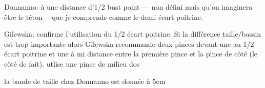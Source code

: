 \documentclass[10pt,a4paper,twoside]{report}
\begin{document}
Donnanno: à une distance d'1/2 bust point --- non défini mais qu'on imaginera être le téton--- que je comprends comme le demi écart poitrine.

Gilewska: confirme l'utilisation du 1/2 écart poitrine. Si la différence taille/bassin est trop importante alors Gilewska recommande deux pinces devant une au 1/2 écart poitrine et une à mi distance entre la première pince et la pince de côté (le côté de fait). utlise une pince de milieu dos

la bande de taille chez Donnanno est donnée à 5cm



\end{document}
